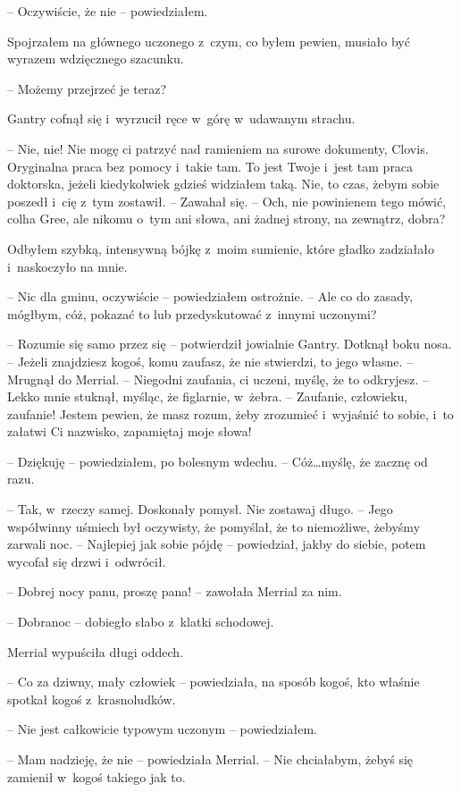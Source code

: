 \documentclass[oneside,polish,11pt,sfheadings]{mwbk}
\begin{document}
-- Oczywiście, że nie -- powiedziałem.

Spojrzałem na głównego uczonego z~czym, co byłem pewien, musiało być
wyrazem wdzięcznego szacunku. 

-- Możemy przejrzeć je teraz?

Gantry cofnął się i~wyrzucił ręce w~górę w~udawanym strachu. 

-- Nie, nie!
Nie mogę ci patrzyć nad ramieniem na surowe dokumenty, Clovis.
Oryginalna praca bez pomocy i~takie tam. To jest Twoje i~jest tam praca
doktorska, jeżeli kiedykolwiek gdzieś widziałem taką. Nie, to czas,
żebym sobie poszedł i~cię z~tym zostawił. -- Zawahał się. -- Och, nie
powinienem tego mówić, colha Gree, ale nikomu o~tym ani słowa, ani
żadnej strony, na zewnątrz, dobra?

Odbyłem szybką, intensywną bójkę z~moim sumienie, które gładko
zadziałało i~naskoczyło na mnie. 

-- Nic dla gminu, oczywiście -- powiedziałem ostrożnie. -- Ale co do zasady, mógłbym, cóż, pokazać to lub
przedyskutować z~innymi uczonymi?

-- Rozumie się samo przez się -- potwierdził jowialnie Gantry. Dotknął
boku nosa. -- Jeżeli znajdziesz kogoś, komu zaufasz, że nie stwierdzi, to
jego własne. -- Mrugnął do Merrial. -- Niegodni zaufania, ci uczeni,
myślę, że to odkryjesz. -- Lekko mnie stuknął, myśląc, że figlarnie, w~żebra. -- Zaufanie, człowieku, zaufanie! Jestem pewien, że masz rozum,
żeby zrozumieć i~wyjaśnić to sobie, i~to załatwi Ci nazwisko, zapamiętaj
moje słowa!

-- Dziękuję -- powiedziałem, po bolesnym wdechu. -- Cóż\ldots myślę, że zacznę
od razu.

-- Tak, w~rzeczy samej. Doskonały pomysł. Nie zostawaj długo. -- Jego
współwinny uśmiech był oczywisty, że pomyślał, że to niemożliwe, żebyśmy
zarwali noc. -- Najlepiej jak sobie pójdę -- powiedział, jakby do siebie,
potem wycofał się drzwi i~odwrócił.

-- Dobrej nocy panu, proszę pana! -- zawołała Merrial za nim.

-- Dobranoc -- dobiegło słabo z~klatki schodowej.

Merrial wypuściła długi oddech.

-- Co za dziwny, mały człowiek -- powiedziała, na sposób kogoś, kto
właśnie spotkał kogoś z~krasnoludków.

-- Nie jest całkowicie typowym uczonym -- powiedziałem.

-- Mam nadzieję, że nie -- powiedziała Merrial. -- Nie chciałabym, żebyś
się zamienił w~kogoś takiego jak to.
\end{document}
